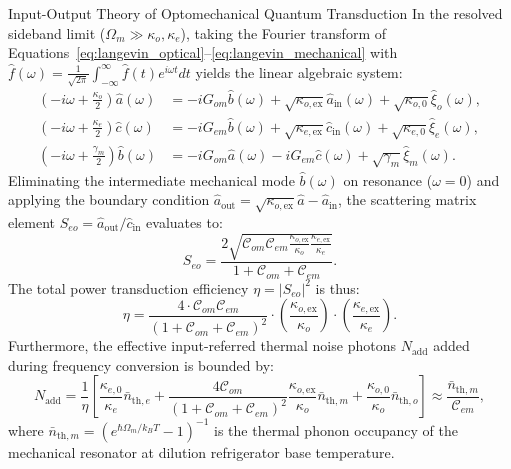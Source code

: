 \begin{theorembox}{Input-Output Theory of Optomechanical Quantum Transduction}
In the resolved sideband limit ($\Omega_m \gg \kappa_o, \kappa_e$), taking the Fourier transform of Equations~\ref{eq:langevin_optical}--\ref{eq:langevin_mechanical} with $\hat{f}(\omega) = \frac{1}{\sqrt{2\pi}}\int_{-\infty}^\infty \hat{f}(t) e^{i\omega t} dt$ yields the linear algebraic system:
\begin{align}
    \left( -i\omega + \frac{\kappa_o}{2} \right) \hat{a}(\omega) &= -i G_{om} \hat{b}(\omega) + \sqrt{\kappa_{o,\text{ex}}} \hat{a}_{\text{in}}(\omega) + \sqrt{\kappa_{o,0}} \hat{\xi}_o(\omega), \\
    \left( -i\omega + \frac{\kappa_e}{2} \right) \hat{c}(\omega) &= -i G_{em} \hat{b}(\omega) + \sqrt{\kappa_{e,\text{ex}}} \hat{c}_{\text{in}}(\omega) + \sqrt{\kappa_{e,0}} \hat{\xi}_e(\omega), \\
    \left( -i\omega + \frac{\gamma_m}{2} \right) \hat{b}(\omega) &= -i G_{om} \hat{a}(\omega) - i G_{em} \hat{c}(\omega) + \sqrt{\gamma_m} \hat{\xi}_m(\omega).
\end{align}
Eliminating the intermediate mechanical mode $\hat{b}(\omega)$ on resonance ($\omega = 0$) and applying the boundary condition $\hat{a}_{\text{out}} = \sqrt{\kappa_{o,\text{ex}}} \hat{a} - \hat{a}_{\text{in}}$, the scattering matrix element $S_{eo} = \hat{a}_{\text{out}} / \hat{c}_{\text{in}}$ evaluates to:
\begin{equation}
    S_{eo} = \frac{2 \sqrt{\mathcal{C}_{om} \mathcal{C}_{em} \frac{\kappa_{o,\text{ex}}}{\kappa_o} \frac{\kappa_{e,\text{ex}}}{\kappa_e}}}{1 + \mathcal{C}_{om} + \mathcal{C}_{em}}.
    \label{eq:scattering_matrix_transduction}
\end{equation}
The total power transduction efficiency $\eta = |S_{eo}|^2$ is thus:
\begin{equation}
    \eta = \frac{4 \cdot \mathcal{C}_{om} \mathcal{C}_{em}}{\left( 1 + \mathcal{C}_{om} + \mathcal{C}_{em} \right)^2} \cdot \left( \frac{\kappa_{o,\text{ex}}}{\kappa_o} \right) \cdot \left( \frac{\kappa_{e,\text{ex}}}{\kappa_e} \right).
\end{equation}
Furthermore, the effective input-referred thermal noise photons $N_{\text{add}}$ added during frequency conversion is bounded by:
\begin{equation}
    N_{\text{add}} = \frac{1}{\eta} \left[ \frac{\kappa_{e,0}}{\kappa_e} \bar{n}_{\text{th},e} + \frac{4 \mathcal{C}_{om}}{(1 + \mathcal{C}_{om} + \mathcal{C}_{em})^2} \frac{\kappa_{o,\text{ex}}}{\kappa_o} \bar{n}_{\text{th},m} + \frac{\kappa_{o,0}}{\kappa_o} \bar{n}_{\text{th},o} \right] \approx \frac{\bar{n}_{\text{th},m}}{\mathcal{C}_{em}},
    \label{eq:added_noise_transduction}
\end{equation}
where $\bar{n}_{\text{th},m} = (e^{\hbar \Omega_m / k_B T} - 1)^{-1}$ is the thermal phonon occupancy of the mechanical resonator at dilution refrigerator base temperature.
\end{theorembox}

